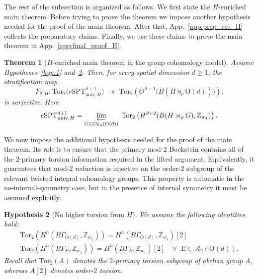 \documentclass[aps,prx,reprint,superscriptaddress,twocolumn,amsmath,amssymb,amsfonts, nofootinbib]{revtex4-2}
\newcommand{\ofin}{\mathcal{O}_{\text{fin}}}
\newcommand{\tor}{\text{Tor}}
\newcommand{\Z}{\mathbb{Z}}
\theoremstyle{apsstyle}
\newtheorem{theorem}{Theorem}[section]
\newtheorem{hypothesis}[theorem]{Hypothesis}
\begin{document}
The rest of the subsection is organized as follows. We first state the $H$-enriched main theorem. Before trying to prove the theorem we impose another hypothesis needed for the proof of the main theorem. After that, App.~\ref{app:prep_res_H} collects the preparatory claims. Finally, we use these claims to prove the main theorem in App.~\ref{app:final_proof_H}.

\bigskip 

\begin{theorem}[$H$-enriched main theorem in the group cohomology model]
\label{appG:main_theorem_H}
Assume Hypotheses~\ref{hyp:1} and~\ref{hyp:2}. Then, for every spatial dimension $d\geq 1$, the stratification map
\begin{equation}
F_{2,H}:
\tor_{2}\bigl( \mathrm{cSPT}^{d+1}_{\mathrm{univ}, H} \bigr)
\;\twoheadrightarrow\;
\tor_{2}\left(\Theta^{d+1} \bigl(B(H\rtimes_{\rho} \mathrm{O}(d))\bigr)\right).
\end{equation}
is surjective. Here 
\begin{equation*}
\mathrm{cSPT}^{d+1}_{\mathrm{univ},H}=\varprojlim\limits_{G\in \ofin(\mathrm{O}(d))} \; \tor_{2} \left(H^{d+2}(B(H\rtimes_{\rho}G),\Z_{w_1})\right).
\end{equation*}
\end{theorem}

\bigskip 


\noindent We now impose the additional hypothesis needed for the proof of the main theorem. Its role is to ensure that the primary mod-$2$ Bockstein contains all of the $2$-primary torsion information required in the lifted argument. Equivalently, it guarantees that mod-$2$ reduction is injective on the order-$2$ subgroup of the relevant twisted integral cohomology groups. This property is automatic in the no-internal-symmetry case, but in the presence of internal symmetry it must be assumed explicitly.

\bigskip 

\begin{hypothesis}[No higher torsion from $H$]
    \label{hyp:2}
    We assume the following identities hold:
    \begin{gather*}
        \mathrm{Tor}_{2}(H^{n}(B\Gamma_{\mathrm{O}(d)}, \mathbb{Z}_{w_{1}}))= H^{n}(B\Gamma_{\mathrm{O}(d)}, \mathbb{Z}_{w_{1}})[2]\\ 
        \mathrm{Tor}_{2}(H^{n}(B\Gamma_E, \mathbb{Z}_{w_{1}}))= H^{n}(B\Gamma_E, \mathbb{Z}_{w_{1}})[2]\quad \forall\;\; E\in \mathcal{A}_{2}(\mathrm{O}(d)).
    \end{gather*}
    Recall that $\tor_{2}(A)$ denotes the $2$-primary torsion subgroup of abelian group $A$, whereas $A[2]$ denotes order-$2$ torsion. 
\end{hypothesis}
\end{document}
